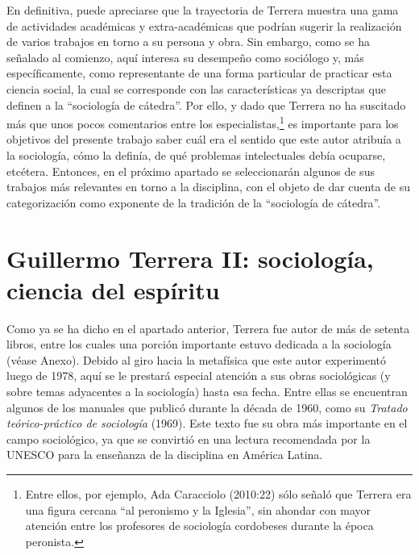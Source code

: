 En definitiva, puede apreciarse que la trayectoria de Terrera muestra una gama de actividades académicas y extra-académicas que podrían sugerir la realización de varios trabajos en torno a su persona y obra. Sin embargo, como se ha señalado al comienzo, aquí interesa su desempeño como sociólogo y, más específicamente, como representante de una forma particular de practicar esta ciencia social, la cual se corresponde con las características ya descriptas que definen a la ``sociología de cátedra''. Por ello, y dado que Terrera no ha suscitado más que unos pocos comentarios entre los especialistas,\footnote{Entre ellos, por ejemplo, Ada Caracciolo (2010:22) sólo señaló que Terrera era una figura cercana ``al peronismo y la Iglesia'', sin ahondar con mayor atención entre los profesores de sociología cordobeses durante la época peronista.} es importante para los objetivos del presente trabajo saber cuál era el sentido que este autor atribuía a la sociología, cómo la definía, de qué problemas intelectuales debía ocuparse, etcétera. Entonces, en el próximo apartado se seleccionarán algunos de sus trabajos más relevantes en torno a la disciplina, con el objeto de dar cuenta de su categorización como exponente de la tradición de la ``sociología de cátedra''.

\section{Guillermo Terrera II: sociología, ciencia del espíritu}

Como ya se ha dicho en el apartado anterior, Terrera fue autor de más de setenta libros, entre los cuales una porción importante estuvo dedicada a la sociología (véase Anexo). Debido al giro hacia la metafísica que este autor experimentó luego de 1978, aquí se le prestará especial atención a sus obras sociológicas (y sobre temas adyacentes a la sociología) hasta esa fecha. Entre ellas se encuentran algunos de los manuales que publicó durante la década de 1960, como su \emph{Tratado teórico-práctico de sociología} (1969). Este texto fue su obra más importante en el campo sociológico, ya que se convirtió en una lectura recomendada por la UNESCO para la enseñanza de la disciplina en América Latina.

